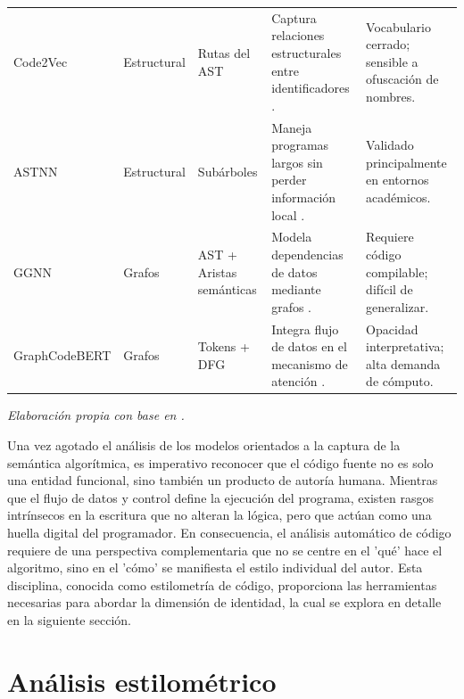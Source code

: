 {\begin{xltabular}{\textwidth}{>{\raggedright\arraybackslash}p{2.5cm} >{\raggedright\arraybackslash}p{2.2cm} >{\raggedright\arraybackslash}p{2.8cm} >{\raggedright\arraybackslash}X >{\raggedright\arraybackslash}X}
    Code2Vec & Estructural & Rutas del AST & Captura relaciones estructurales entre identificadores \cite{Alon2018Code2Vec}. & Vocabulario cerrado; sensible a ofuscación de nombres. \\
    \addlinespace
    
    ASTNN & Estructural & Subárboles & Maneja programas largos sin perder información local \cite{Zhang2019ASTNeural}. & Validado principalmente en entornos académicos. \\
    \addlinespace
    
    GGNN & Grafos & AST + Aristas semánticas & Modela dependencias de datos mediante grafos \cite{Allamanis2018Graphs}. & Requiere código compilable; difícil de generalizar. \\
    \addlinespace
    
    GraphCodeBERT & Grafos & Tokens + DFG & Integra flujo de datos en el mecanismo de atención \cite{Guo2021GraphCodeBERT}. & Opacidad interpretativa; alta demanda de cómputo. \\

\end{xltabular}

\nopagebreak
\footnotesize\textit{Elaboración propia con base en \cite{Feng2020CodeBERT, Liu2019RoBERTa, Alon2018Code2Vec, Zhang2019ASTNeural, Allamanis2018Graphs, Guo2021GraphCodeBERT}.}

} %

Una vez agotado el análisis de los modelos orientados a la captura de la semántica algorítmica, es imperativo reconocer que el código fuente no es solo una entidad funcional, sino también un producto de autoría humana. Mientras que el flujo de datos y control define la ejecución del programa, existen rasgos intrínsecos en la escritura que no alteran la lógica, pero que actúan como una huella digital del programador. En consecuencia, el análisis automático de código requiere de una perspectiva complementaria que no se centre en el 'qué' hace el algoritmo, sino en el 'cómo' se manifiesta el estilo individual del autor. Esta disciplina, conocida como estilometría de código, proporciona las herramientas necesarias para abordar la dimensión de identidad, la cual se explora en detalle en la siguiente sección.

\section{Análisis estilométrico}

